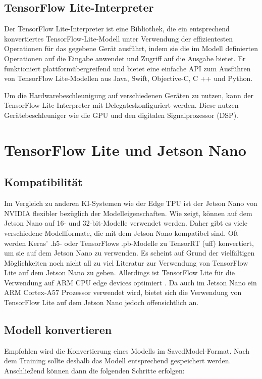 \section{TensorFlow Lite-Interpreter}
Der TensorFlow Lite-Interpreter ist eine Bibliothek, die ein entsprechend konvertiertes TensorFlow-Lite-Modell unter Verwendung der effizientesten
Operationen für das gegebene Gerät ausführt, indem sie die im Modell definierten Operationen auf die Eingabe anwendet und Zugriff auf die
Ausgabe bietet. Er funktioniert plattformübergreifend und bietet eine einfache API zum Ausführen von TensorFlow Lite-Modellen aus Java, Swift, 
Objective-C, C ++ und Python.\cite{Google.09.10.2020}\cite{Warden:2020}

Um die Hardwarebeschleunigung auf verschiedenen Geräten zu nutzen, kann der TensorFlow Lite-Interpreter mit \glqq Delegates\grqq konfiguriert werden. 
Diese nutzen Gerätebeschleuniger wie die GPU und den digitalen Signalprozessor (DSP). \cite{Google.09.10.2020}

\chapter{TensorFlow Lite und Jetson Nano}

\section{Kompatibilität}
Im Vergleich zu anderen KI-Systemen wie der Edge TPU ist der Jetson Nano von NVIDIA flexibler bezüglich der Modelleigenschaften. 
Wie \cite{Stock.07.01.2021} zeigt, können auf dem Jetson Nano auf 16- und 32-bit-Modelle verwendet werden. Daher gibt es viele verschiedene
Modellformate, die mit dem Jetson Nano kompatibel sind. Oft werden Keras' .h5- oder TensorFlows .pb-Modelle zu TensorRT (uff) konvertiert, um sie auf dem
Jetson Nano zu verwenden. Es scheint auf Grund der vielfältigen Möglichkeiten noch nicht all zu viel Literatur zur Verwendung von TensorFlow Lite auf dem
Jetson Nano zu geben. Allerdings ist TensorFlow Lite für die Verwendung auf ARM CPU edge devices optimiert \cite{Jain:2020}. Da auch im Jetson Nano ein 
ARM Cortex-A57 Prozessor verwendet wird, bietet sich die Verwendung von TensorFlow Lite auf dem Jetson Nano jedoch offensichtlich an.

\section{Modell konvertieren}
Empfohlen wird die Konvertierung eines Modells im SavedModel-Format. Nach dem Training sollte deshalb das Modell entsprechend gespeichert werden.
Anschließend können dann die folgenden Schritte erfolgen:

